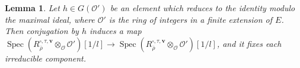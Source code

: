 \documentclass{amsart}
\newtheorem{lem}[subsubsection]{Lemma}
\theoremstyle{definition}
\theoremstyle{remark}
\newtheorem{remark}[subsubsection]{Remark}
\newcommand{\mar}[1]{}
\newcommand{\mar}[1]{\marginpar{\raggedright\tiny squirrel #1}}
\newcommand{\cO}{{\mathcal O}}
\DeclareMathOperator{\Spec}{Spec}
\newcommand{\rhobar}{\overline{\rho}}
\begin{document}
  \begin{lem}
    \label{lem: conjugation preserves components}%
  Let $h\in G(\cO')$ be an element which reduces to the identity modulo the maximal ideal, where $\cO'$ is the ring of integers in a finite extension of $E$.  Then conjugation by $h$ induces a map $\Spec (R_{\rhobar}^{\square,\tau,\mathbf{v}}\otimes_{\cO}\cO')[1/l]\rightarrow\Spec (R_{\rhobar}^{\square,\tau,\mathbf{v}}\otimes_{\cO}\cO')[1/l]$, and it fixes each irreducible component.
  \end{lem}%
\end{document}
